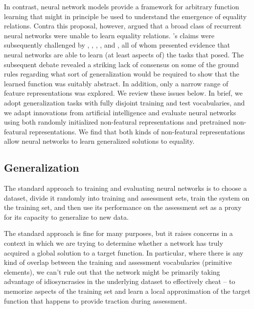 \documentclass{article}
\newcommand{\updatea}[1]{{\color{darkred}#1}}
\begin{document}
In contrast, neural network models provide a framework for arbitrary function learning that might in principle be used to understand the emergence of equality relations. Contra this proposal, however, \citet{marcus:1999} argued that a broad class of recurrent neural networks were unable to learn equality relations. \citeauthor{marcus:1999}'s claims were subsequently challenged by \citet{dienes:1999}, \citet{seidenberg:1999a}, \citet{seidenberg:1999b}, \citet{elman:1999}, and \citet{negishi:1999}, all of whom presented evidence that neural networks are able to learn (at least aspects of) the tasks that \citeauthor{marcus:1999} posed. \updatea{The subsequent debate \citep[reviewed in][]{alhama:2019} revealed a striking lack of consensus on some of the ground rules regarding what sort of generalization would be required to show that the learned function was suitably abstract. In addition, only a narrow range of feature representations was explored. We review these issues below. In brief, we adopt generalization tasks with fully disjoint training and test vocabularies, and we adapt innovations from artificial intelligence and evaluate neural networks using both randomly initialized non-featural representations and pretrained non-featural representations. We find that both kinds of non-featural representations allow neural networks to learn generalized solutions to equality.}


\subsection{Generalization}

The standard approach to training and evaluating neural networks is to choose a dataset, divide it randomly into training and assessment sets, train the system on the training set, and then use its performance on the assessment set as a proxy for its capacity to generalize to new data.

The standard approach is fine for many purposes, but it raises concerns in a context in which we are trying to determine whether a network has truly acquired a global solution to a target function. In particular, where there is any kind of overlap between the training and assessment vocabularies (primitive elements), we can't rule out that the network might be primarily taking advantage of idiosyncrasies in the underlying dataset to effectively cheat -- to memorize aspects of the training set and learn a local approximation of the target function that happens to provide traction during assessment.
\end{document}
